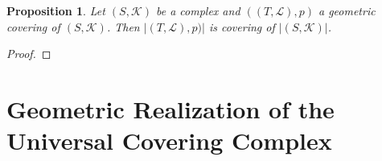 \documentclass{amsart}
\newtheorem{proposition}{Proposition}[section]
\begin{document}
\begin{proposition}
Let $(S,\mathcal{K})$ be a complex and $((T,\mathcal{L}),p)$ a geometric covering of $(S,\mathcal{K})$. Then $\vert (T,\mathcal{L}), p)\vert $ is covering of $\vert (S,\mathcal{K})\vert$.
\end{proposition}

\begin{proof}

\end{proof}


\section{Geometric Realization of the Universal Covering Complex}





\end{document}
